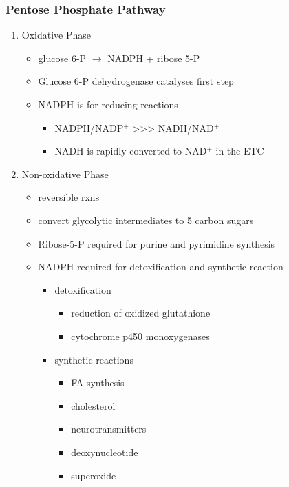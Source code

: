 \documentclass{scrartcl}
\begin{document}
\subsubsection{Pentose Phosphate Pathway}
\label{sec:orgd448ea8}
\begin{enumerate}
\item Oxidative Phase
\label{sec:org0778592}
\begin{itemize}
\item glucose 6-P \(\to\) NADPH + ribose 5-P
\item Glucose 6-P dehydrogenase catalyses first step
\item NADPH is for reducing reactions
\begin{itemize}
\item NADPH/NADP\(^{\text{+}}\) \textgreater{}\textgreater{}\textgreater{} NADH/NAD\(^{\text{+}}\)
\item NADH is rapidly converted to NAD\(^{\text{+}}\) in the ETC
\end{itemize}
\end{itemize}
\item Non-oxidative Phase
\label{sec:org23caad4}
\begin{itemize}
\item reversible rxns
\item convert glycolytic intermediates to 5 carbon sugars

\item Ribose-5-P required for purine and pyrimidine synthesis
\item NADPH required for detoxification and synthetic reaction
\begin{itemize}
\item detoxification
\begin{itemize}
\item reduction of oxidized glutathione
\item cytochrome p450 monoxygenases
\end{itemize}
\item synthetic reactions
\begin{itemize}
\item FA synthesis
\item cholesterol
\item neurotransmitters
\item deoxynucleotide
\item superoxide
\end{itemize}
\end{itemize}
\end{itemize}
\end{enumerate}
\end{document}
